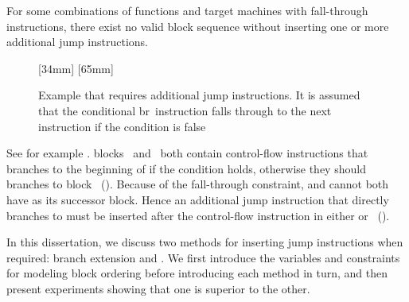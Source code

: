 For some combinations of \glspl{function} and \glspl{target machine} with
\gls{fall-through} \glspl{instruction}, there exist no valid \gls{block}
sequence without inserting one or more additional jump \glspl{instruction}.
%
\begin{figure}
  \setlength{\opNodeDist}{20pt}%

  \mbox{}%
  \hfill%
                [34mm]%
                {%
                }%
  \hfill%
                [65mm]%
                {%
                  \hspace{6mm}%
                }%
  \hfill%
  \mbox{}

  \caption[Example that requires additional jump instructions]%
          {%
            Example that requires additional jump instructions.
            It is assumed that the conditional {\instrFont br}~instruction
            falls through to the next instruction if the condition is false%
          }
\end{figure}
%
See for example .
%
\Glspl{block}~ and~ both contain control-flow
\glspl{instruction} that branches to the beginning of  if the
condition holds, otherwise they should branches to block~
().
%
Because of the fall-through \gls{constraint},  and 
cannot both have  as its successor \gls{block}.
%
Hence an additional jump \gls{instruction} that directly branches to
 must be inserted after the control-flow \gls{instruction} in either
 or~ ().

In this dissertation, we discuss two methods for inserting jump
\glspl{instruction} when required: \gls{branch extension} and .
%
We first introduce the \glspl{variable} and \glspl{constraint} for modeling
\gls{block ordering} before introducing each method in turn, and then present
experiments showing that one is superior to the other.


